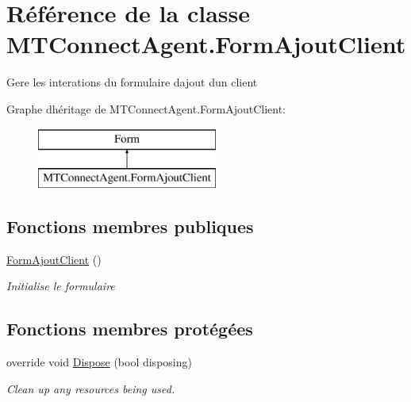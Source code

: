 \hypertarget{class_m_t_connect_agent_1_1_form_ajout_client}{}\section{Référence de la classe M\+T\+Connect\+Agent.\+Form\+Ajout\+Client}
\label{class_m_t_connect_agent_1_1_form_ajout_client}


Gere les interations du formulaire d\textquotesingle{}ajout d\textquotesingle{}un client  


Graphe d\textquotesingle{}héritage de M\+T\+Connect\+Agent.\+Form\+Ajout\+Client\+:\begin{figure}[H]
\begin{center}
\leavevmode
\includegraphics[height=2.000000cm]{class_m_t_connect_agent_1_1_form_ajout_client}
\end{center}
\end{figure}
\subsection*{Fonctions membres publiques}
\begin{DoxyCompactItemize}
\item 
\mbox{\hyperlink{class_m_t_connect_agent_1_1_form_ajout_client_a9e308a7b3f687af4d8fb9a1ab11b5a9c}{Form\+Ajout\+Client}} ()
\begin{DoxyCompactList}\small\item\em Initialise le formulaire \end{DoxyCompactList}\end{DoxyCompactItemize}
\subsection*{Fonctions membres protégées}
\begin{DoxyCompactItemize}
\item 
override void \mbox{\hyperlink{class_m_t_connect_agent_1_1_form_ajout_client_ac88e5455f9da53d0479aaeb68eaa2497}{Dispose}} (bool disposing)
\begin{DoxyCompactList}\small\item\em Clean up any resources being used. \end{DoxyCompactList}\end{DoxyCompactItemize}
